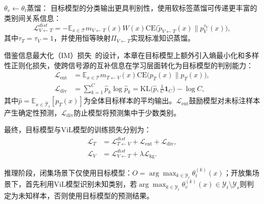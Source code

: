 $\theta_v\leftarrow\theta_t$蒸馏： 目标模型的分类输出更具判别性，使用软标签蒸馏可传递更丰富的类别间关系信息：
\begin{equation}
\mathcal{L}_{V\leftarrow T}^{dist} = -\mathbb{E}_{x\in\mathcal{T}}m_{V\leftarrow T}(x)W(x)\mathrm{CE}\big(\tilde{p}_{V\leftarrow T}(x) \| p_V^{\tau_V}(x)\big),
\label{eq:dist_v_from_t}
\end{equation}
其中$\tau_T=\tau_V=1$，并使用恒等映射$\Pi_{V\leftarrow T}$实现标准知识蒸馏。

借鉴信息最大化（IM）损失~\cite{gomes2010discriminative}的设计，本章在目标模型上额外引入熵最小化和多样性正则化损失，使跨信号源的互补信息在学习层面转化为目标模型的判别能力：
\begin{align}
\mathcal{L}_{\text{ent}} & = \mathbb{E}_{x\in\mathcal{T}}m_{T\leftarrow V}(x)\mathrm{CE}\big(p_T(x) \| p_T(x)\big), 
\label{eq:loss_ent}\\
\mathcal{L}_{\text{div}} & = \sum_{k=1}^{C}\hat{p}_k\log\hat{p}_k = \mathrm{KL}\big(\hat{p},\tfrac{1}{C}\mathbf{1}_C\big) - \log C, 
\label{eq:loss_div}
\end{align}
其中$\hat{p}=\mathbb{E}_{x\in\hat{\mathcal{T}}_t}[p_T(x)]$为全体目标样本的平均输出。$\mathcal{L}_{\text{ent}}$鼓励模型对未标注样本产生确定性预测，$\mathcal{L}_{\text{div}}$防止模型将预测集中于少数类别。

最终，目标模型与ViL模型的训练损失分别为：
\begin{align}
\mathcal{L}_T &= \mathcal{L}_{T\leftarrow V}^{dist} + \mathcal{L}_{\text{ent}} + \mathcal{L}_{\text{div}},
\label{eq:loss_T}\\
\mathcal{L}_V &= \mathcal{L}_{V\leftarrow T}^{dist} + \lambda \mathcal{L}_{\text{kg}}.
\label{eq:loss_V}
\end{align}

推理阶段，闭集场景下仅使用目标模型：$O=\arg\max_{k\in\mathcal{Y}_t}\theta_t^{(k)}(x)$；开放集场景下，首先利用ViL模型识别未知类别，若$\arg\max_{k\in\mathcal{Y}_t}\theta_v^{(k)}(x)\in\mathcal{Y}_t\setminus\mathcal{Y}_s$则判定为未知样本，否则使用目标模型的预测结果。


